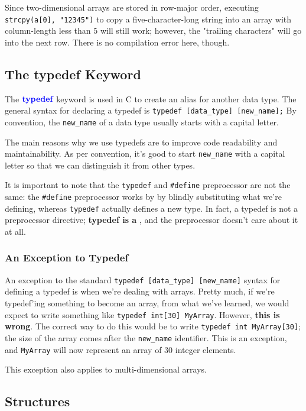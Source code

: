 Since two-dimensional arrays are stored in row-major order, executing \verb!strcpy(a[0], "12345")! to copy a five-character-long string into an array with column-length less than $5$ will still work; however, the "trailing characters" will go into the next row. There is no compilation error here, though.


\subsection{The typedef Keyword}

The $\textbf{\color{blue} typedef}$ keyword is used in C to create an alias for another data type. The general syntax for declaring a typedef is \verb!typedef [data_type] [new_name];! By convention, the \verb!new_name! of a data type usually starts with a capital letter. 

The main reasons why we use typedefs are to improve code readability and maintainability. As per convention, it's good to start \verb!new_name! with a capital letter so that we can distinguish it from other types. 


It is important to note that the \verb!typedef! and \verb!#define! preprocessor are not the same: the \verb!#define! preprocessor works by by blindly substituting what we're defining, whereas \verb!typedef! actually defines a new type. 
In fact, a typedef is not a preprocessor directive; \textbf{typedef is a} , and the preprocessor doesn't care about it at all. 

\subsubsection{An Exception to Typedef}

An exception to the standard \verb!typedef [data_type] [new_name]! syntax for defining a typedef is when we're dealing with arrays. Pretty much, if we're typedef'ing something to become an array, from what we've learned, we would expect to write something like \verb!typedef int[30] MyArray!. However, \textbf{this is wrong}. The correct way to do this would be to write \verb!typedef int MyArray[30]!; the size of the array comes after the \verb!new_name! identifier. This is an exception, and \verb!MyArray! will now represent an array of $30$ integer elements. 

This exception also applies to multi-dimensional arrays.

\subsection{Structures}

